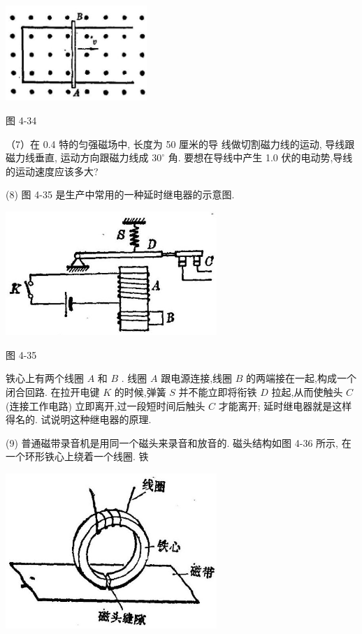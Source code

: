 \documentclass[10pt]{article}
\begin{document}
\begin{center}
\includegraphics[max width=0.4\textwidth]{images/01913056-1f15-74d8-9184-9aab52c9d66b_156_115340.jpg}
\end{center}

图 4-34

（7）在 0.4 特的匀强磁场中, 长度为 50 厘米的导 线做切割磁力线的运动, 导线跟磁力线垂直, 运动方向跟磁力线成 \({30}^{ \circ }\) 角. 要想在导线中产生 1.0 伏的电动势,导线的运动速度应该多大?

(8) 图 4-35 是生产中常用的一种延时继电器的示意图.

\begin{center}
\includegraphics[max width=0.6\textwidth]{images/01913056-1f15-74d8-9184-9aab52c9d66b_157_266631.jpg}
\end{center}

图 4-35

铁心上有两个线圈 \(A\) 和 \(B\) . 线圈 \(A\) 跟电源连接,线圈 \(B\) 的两端接在一起,构成一个闭合回路. 在拉开电键 \(K\) 的时候,弹簧 \(S\) 并不能立即将衔铁 \(D\) 拉起,从而使触头 \(C\) (连接工作电路) 立即离开,过一段短时间后触头 \(C\) 才能离开; 延时继电器就是这样得名的. 试说明这种继电器的原理.

(9) 普通磁带录音机是用同一个磁头来录音和放音的. 磁头结构如图 4-36 所示, 在一个环形铁心上绕着一个线圈. 铁

\begin{center}
\includegraphics[max width=0.6\textwidth]{images/01913056-1f15-74d8-9184-9aab52c9d66b_157_155633.jpg}
\end{center}
\end{document}
